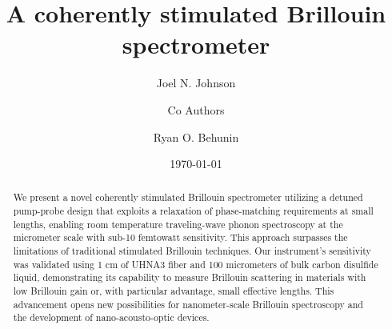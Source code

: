 \documentclass[%
  reprint,
  superscriptaddress,
  amsmath,amssymb,
  aps,
  prapplied,
]{revtex4-2}
\begin{document}

\title{A coherently stimulated Brillouin spectrometer}

\author{Joel N. Johnson}

\author{Co Authors}

\author{Ryan O. Behunin}

\date{\today}

\begin{abstract}
We present a novel coherently stimulated Brillouin spectrometer utilizing a detuned pump-probe design that exploits a relaxation of phase-matching requirements at small lengths, enabling room temperature traveling-wave phonon spectroscopy at the micrometer scale with sub-10 femtowatt sensitivity. This approach surpasses the limitations of traditional stimulated Brillouin techniques. Our instrument's sensitivity was validated using 1 cm of UHNA3 fiber and 100 micrometers of bulk carbon disulfide liquid, demonstrating its capability to measure Brillouin scattering in materials with low Brillouin gain or, with particular advantage, small effective lengths. This advancement opens new possibilities for nanometer-scale Brillouin spectroscopy and the development of nano-acousto-optic devices.

\end{abstract}

\end{document}
